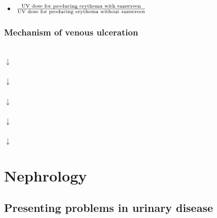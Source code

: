 \documentclass[
  12pt,
]{memoir}
\providecommand{\tightlist}{%
  \setlength{\itemsep}{0pt}\setlength{\parskip}{0pt}}
\begin{document}
\begin{itemize}
\tightlist
\item
  \(\frac{\LARGE{\text{UV dose for producing erythema with sunscreen}}} {\LARGE{\text{UV dose for producing erythema without sunscreen}}}\)
\end{itemize}

\hypertarget{mechanism-of-venous-ulceration}{%
\subsection{Mechanism of venous
ulceration}\label{mechanism-of-venous-ulceration}}

\begin{center}
 \\
$\downarrow$ \\
 \\
$\downarrow$ \\
 \\
$\downarrow$ \\
 \\
$\downarrow$ \\
 \\
$\downarrow$ \\
\end{center}

\pagebreak

\hypertarget{nephrology}{%
\chapter{Nephrology}\label{nephrology}}

\hypertarget{presenting-problems-in-urinary-disease}{%
\section{Presenting problems in urinary
disease}\label{presenting-problems-in-urinary-disease}}
\end{document}
